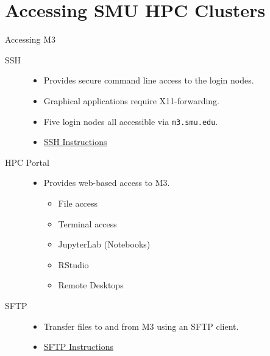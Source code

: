 \section{Accessing SMU HPC Clusters}

\begin{frame}{Accessing M3}
\begin{description}
\item[SSH]
\begin{itemize}
  \item Provides secure command line access to the login nodes.
  \item Graphical applications require X11-forwarding.
  \item Five login nodes all accessible via \texttt{m3.smu.edu}.
  \item \href{https://southernmethodistuniversity.github.io/hpc_docs/access.html}{SSH Instructions}
\end{itemize}
\item[HPC Portal]
\begin{itemize}
  \item Provides web-based access to M3.
  \begin{itemize}
    \item File access
    \item Terminal access
    \item JupyterLab (Notebooks)
    \item RStudio
    \item Remote Desktops
  \end{itemize}
\end{itemize}
\item[SFTP]
\begin{itemize}
  \item Transfer files to and from M3 using an SFTP client.
  \item \href{https://southernmethodistuniversity.github.io/hpc_docs/access.html}{SFTP Instructions}
\end{itemize}
\end{description}
\end{frame}

